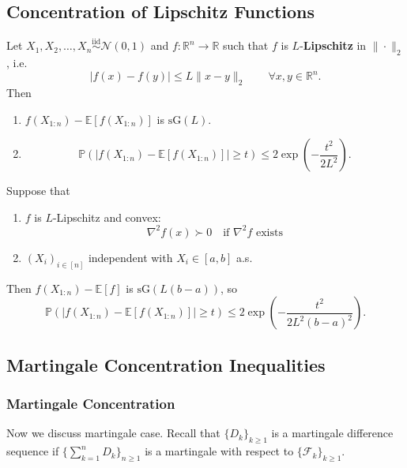 \subsection{Concentration of Lipschitz Functions}

\begin{thm}
Let $X_1, X_2, \ldots, X_n \overset{\mathrm{iid}}{\sim} \mathcal{N}(0, 1)$ and $f : \mathbb{R}^n \to \mathbb{R}$ such that $f$ is $L$-\textbf{Lipschitz} in $\|\cdot\|_2$, i.e.
\[
|f(x) - f(y)| \leq L \|x - y\|_2 \qquad \forall x, y \in \mathbb{R}^n.
\]
Then
\begin{enumerate}
    \item $f(X_{1:n}) - \mathbb{E}[f(X_{1:n})]$ is $\mathrm{sG}(L)$.
    \item 
    \[
    \mathbb{P}(|f(X_{1:n}) - \mathbb{E}[f(X_{1:n})]| \geq t) \leq 2 \exp\!\left( -\frac{t^2}{2 L^2} \right).
    \]
\end{enumerate}
\end{thm}

\begin{thm}
Suppose that
\begin{enumerate}
    \item $f$ is $L$-Lipschitz and convex:
    \[
    \nabla^2 f(x) \succ 0 \quad \text{if } \nabla^2 f \text{ exists}
    \]
    \item $(X_i)_{i \in [n]}$ independent with $X_i \in [a, b]$ a.s.
\end{enumerate}
Then $f(X_{1:n}) - \mathbb{E}[f]$ is $\mathrm{sG}(L(b-a))$, so
\[
\mathbb{P}(|f(X_{1:n}) - \mathbb{E}[f(X_{1:n})]| \geq t) \leq 2 \exp\left( -\frac{t^2}{2L^2(b-a)^2} \right).
\]
\end{thm}

\subsection{Martingale Concentration Inequalities}
\subsubsection{Martingale Concentration}
Now we discuss martingale case. Recall that 
$\{D_k\}_{k \geq 1}$ is a martingale difference sequence if $\{\sum_{k=1}^n D_k\}_{n \geq 1}$ is a martingale with respect to $\{\mathcal{F}_k\}_{k \geq 1}$.

